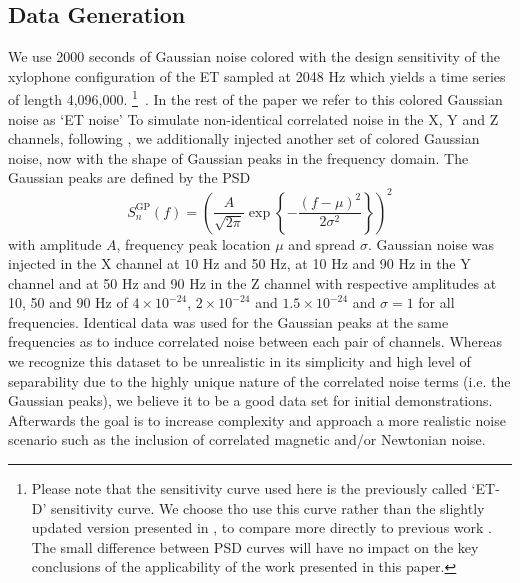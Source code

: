 \documentclass[%
 reprint,
 amsmath,amssymb,
 aps,
]{revtex4-2}
\begin{document}
\subsection{Data Generation}
We use 2000 seconds of  
Gaussian noise colored with the design sensitivity of the
xylophone configuration of the ET sampled at 2048 Hz which yields a time series of length 4,096,000.  \footnote{Please note that the sensitivity curve used here is the previously called `ET-D' sensitivity curve. We choose tho use this curve rather than the slightly updated version presented in \cite{Branchesi:2023mws}, to compare more directly to previous work \cite{Janssens2023}. The small difference between PSD curves will have no impact on the key conclusions of the applicability of the work presented in this paper.}~\cite{Hild_2009,Hild:2010id}. In the rest of the
paper we refer to this colored Gaussian noise as `ET noise' %
To simulate  non-identical correlated noise in the X, Y and Z channels, following \cite{Janssens2023}, we additionally injected another set of colored Gaussian noise, now with the shape of Gaussian peaks in the frequency domain. The Gaussian peaks are defined by the PSD
\[ S_n^{\mathrm{GP}}(f)= \left( \frac{A}{\sqrt{2\pi}}\exp\left\{ 
- \frac{(f-\mu)^2}{2\sigma^2}\right\}\right)^2\]
with amplitude $A$, frequency peak location $\mu$ and spread $\sigma$.
Gaussian noise was
injected in the X channel at $10$ Hz and 50 Hz, at 10
Hz and 90 Hz in the Y channel and at 50 Hz and 90 Hz in the Z channel with respective amplitudes at 10, 50 and 90 Hz of $4\times 10^{-24}$, $2\times 10^{-24}$ and $1.5\times 10^{-24}$ and $\sigma=1$ for all frequencies. Identical data was used for the Gaussian peaks at the same frequencies as to induce correlated noise between each pair of channels.
Whereas we recognize this dataset to be unrealistic in its simplicity and high level of separability due to the highly unique nature of the correlated noise terms (i.e. the Gaussian peaks), we believe it to be a good data set for initial demonstrations. Afterwards the goal is to increase complexity and approach a more realistic noise scenario such as the inclusion of correlated magnetic and/or Newtonian noise.
\end{document}
